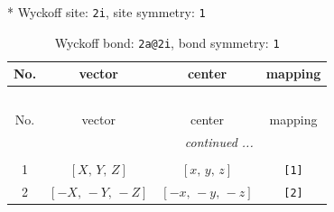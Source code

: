\documentclass[fleqn,8pt]{jsarticle}
\begin{document}
* Wyckoff site: {\tt 2i}, site symmetry: {\tt 1}
\renewcommand{\arraystretch}{1.2}
\begin{longtable}{cccc}
\caption{Wyckoff bond: {\tt 2a@2i}, bond symmetry: {\tt 1}}
 \\
 \hline \hline
No. & vector & center & mapping \\ \hline \endfirsthead

\multicolumn{3}{l}{\tablename\ \thetable{}} \\
 \hline \hline
No. & vector & center & mapping \\ \hline \endhead

 \hline \hline
\multicolumn{3}{r}{\footnotesize\it continued ...} \\ \endfoot

 \hline \hline
\multicolumn{3}{r}{} \\ \endlastfoot

1 & $\left[ X,\, Y,\, Z \right]$ & $\left[ x,\, y,\, z \right]$ & {\tt [1]} \\ \hline
2 & $\left[ - X,\, - Y,\, - Z \right]$ & $\left[ - x,\, - y,\, - z \right]$ & {\tt [2]} \\
\end{longtable}
\end{document}
